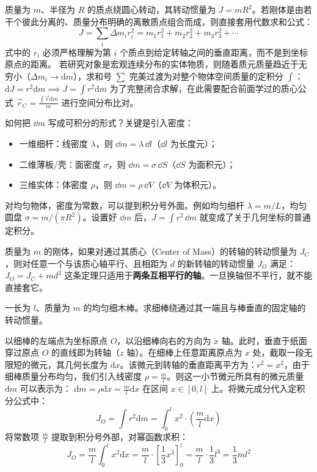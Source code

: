 \begin{definition}
质量为 \(m\)、半径为 \(R\) 的质点绕圆心转动，其转动惯量为 \(J=mR^2\)。若刚体是由若干个彼此分离的、质量分布明确的离散质点组合而成，则直接套用代数求和公式：$$J = \sum_i \Delta m_i r_i^2 = m_1 r_1^2 + m_2 r_2^2 + m_3 r_3^2 + \cdots$$式中的 $r_i$ 必须严格理解为第 $i$ 个质点到给定转轴之间的垂直距离，而不是到坐标原点的距离。
若研究对象是宏观连续分布的实体物质，则随着质元质量趋近于无穷小（$\Delta m_i \to \mathrm{d}m$），求和号 $\sum$ 完美过渡为对整个物体空间质量的定积分 $\int$： \(\mathrm{d}J = r^2 \mathrm{d}m \implies \boxed{J = \int r^2 \mathrm{d}m}\) 为了完整闭合求解，在此需要配合前面学过的质心公式 $\vec{r}_C = \frac{\int \vec{r} \mathrm{d}m}{m}$ 进行空间分布比对。

如何把 \(\dd m\) 写成可积分的形式？关键是引入密度：
\begin{itemize}
\item 一维细杆：线密度 \(\lambda\)，则 \(\dd m=\lambda\,\dd l\)（\(\dd l\) 为长度元）；
\item 二维薄板/壳：面密度 \(\sigma\)，则 \(\dd m=\sigma\,\dd S\)（\(\dd S\) 为面积元）；
\item 三维实体：体密度 \(\rho\)，则 \(\dd m=\rho\,\dd V\)（\(\dd V\) 为体积元）。
\end{itemize}
对均匀物体，密度为常数，可以提到积分号外面。例如均匀细杆 \(\lambda=m/L\)，均匀圆盘 \(\sigma=m/(\pi R^2)\)。设置好 \(\dd m\) 后，\(J=\int r^2\,\dd m\) 就变成了关于几何坐标的普通定积分。
\end{definition}

\begin{theorem}[平行轴定理]
质量为 $m$ 的刚体，如果对通过其质心（Center of Mass）的转轴的转动惯量为 $J_C$，则对任意一个与该质心轴平行、且相距为 $d$ 的新转轴的转动惯量 $J_O$ 满足： \(\boxed{J_O = J_C + md^2}\) 这条定理只适用于\textbf{两条互相平行的轴}。一旦换轴但不平行，就不能直接套它。
\end{theorem}

\begin{exercise}
一长为 $l$、质量为 $m$ 的均匀细木棒。求细棒绕通过其一端且与棒垂直的固定轴的转动惯量。
\end{exercise}
\begin{solution}
以细棒的左端点为坐标原点 $O$，以沿细棒向右的方向为 $x$ 轴。此时，垂直于纸面穿过原点 $O$ 的直线即为转轴（$z$ 轴）。在细棒上任意距离原点为 $x$ 处，截取一段无限短的微元，其几何长度为 $\mathrm{d}x$。该微元到转轴的垂直距离平方为：$r^2 = x^2$，由于细棒质量分布均匀，我们引入线密度 $\rho = \frac{m}{l}$。则这一小节微元所具有的微元质量 $\mathrm{d}m$ 可以表示为： \(\mathrm{d}m = \rho \mathrm{d}x = \frac{m}{l}\mathrm{d}x\) 
在区间 $x \in [0, l]$ 上。将微元成分代入定积分公式中：$$J_O = \int r^2 \mathrm{d}m = \int_{0}^{l} x^2 \cdot \left(\frac{m}{l}\mathrm{d}x\right)$$将常数项 $\frac{m}{l}$ 提取到积分号外部，对幂函数求积：$$J_O = \frac{m}{l} \int_{0}^{l} x^2 \mathrm{d}x = \frac{m}{l} \cdot \left[ \frac{1}{3}x^3 \right]_0^l = \frac{m}{l} \cdot \frac{1}{3}l^3 = \frac{1}{3}ml^2$$
\end{solution}



